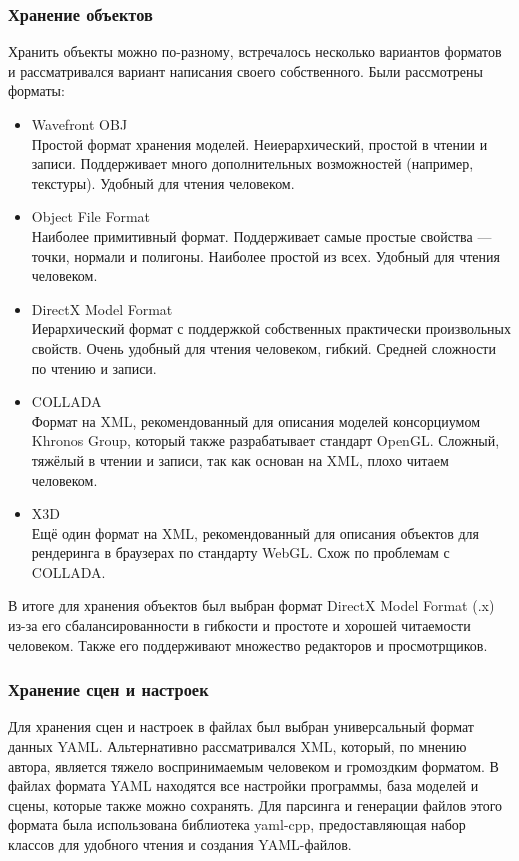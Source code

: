 \documentclass[a4paper,12pt]{report}
\numberwithin{equation}{section}
\begin{document}
\subsubsection{Хранение объектов}
Хранить объекты можно по-разному, встречалось несколько вариантов форматов и рассматривался вариант написания своего собственного.
Были рассмотрены форматы:
\begin{itemize}
\item Wavefront OBJ \\
Простой формат хранения моделей. Неиерархический, простой в чтении и записи. Поддерживает много дополнительных возможностей (например, текстуры). Удобный для чтения человеком.
\item Object File Format \\
Наиболее примитивный формат. Поддерживает самые простые свойства --- точки, нормали и полигоны. Наиболее простой из всех. Удобный для чтения человеком.
\item DirectX Model Format \\
Иерархический формат с поддержкой собственных практически произвольных свойств. Очень удобный для чтения человеком, гибкий. Средней сложности по чтению и записи.
\item COLLADA \\
Формат на XML, рекомендованный для описания моделей консорциумом Khronos Group, который также разрабатывает стандарт OpenGL. Сложный, тяжёлый в чтении и записи, так как основан на XML, плохо читаем человеком.
\item X3D \\
Ещё один формат на XML, рекомендованный для описания объектов для рендеринга в браузерах по стандарту WebGL. Схож по проблемам с COLLADA.
\end{itemize}
В итоге для хранения объектов был выбран формат DirectX Model Format (.x) из-за его сбалансированности в гибкости и простоте и хорошей читаемости человеком. Также его поддерживают множество редакторов и просмотрщиков.

\subsubsection{Хранение сцен и настроек}
Для хранения сцен и настроек в файлах был выбран универсальный формат данных YAML. Альтернативно рассматривался XML, который, по мнению автора, является тяжело воспринимаемым человеком и громоздким форматом. В файлах формата YAML находятся все настройки программы, база моделей и сцены, которые также можно сохранять. Для парсинга и генерации файлов этого формата была использована библиотека yaml-cpp, предоставляющая набор классов для удобного чтения и создания YAML-файлов.
\end{document}
